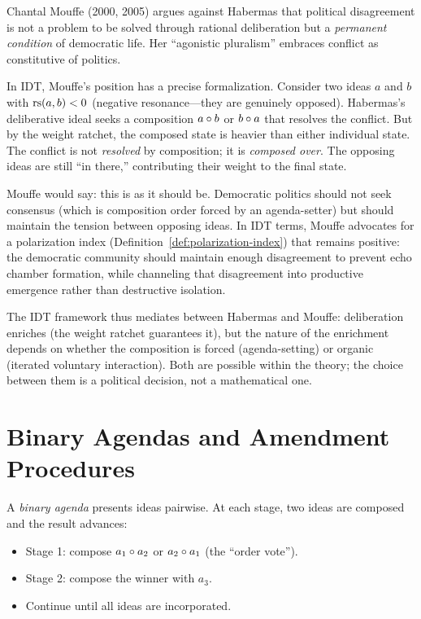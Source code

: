 \begin{interpretation}
\label{interp:mouffe}
Chantal Mouffe (2000, 2005) argues against Habermas that political
disagreement is not a problem to be solved through rational deliberation
but a \emph{permanent condition} of democratic life.  Her ``agonistic
pluralism'' embraces conflict as constitutive of politics.

In IDT, Mouffe's position has a precise formalization.  Consider two
ideas $a$ and $b$ with $\mathrm{rs}(a, b) < 0$ (negative resonance---they are
genuinely opposed).  Habermas's deliberative ideal seeks a composition
$a \circ b$ or $b \circ a$ that resolves the conflict.  But by
the weight ratchet, the composed state is heavier than either individual
state.  The conflict is not \emph{resolved} by composition; it is
\emph{composed over}.  The opposing ideas are still ``in there,''
contributing their weight to the final state.

Mouffe would say: this is as it should be.  Democratic politics should not
seek consensus (which is composition order forced by an agenda-setter) but
should maintain the tension between opposing ideas.  In IDT terms, Mouffe
advocates for a polarization index (Definition~\ref{def:polarization-index})
that remains positive: the democratic community should maintain enough
disagreement to prevent echo chamber formation, while channeling that
disagreement into productive emergence rather than destructive isolation.

The IDT framework thus mediates between Habermas and Mouffe: deliberation
enriches (the weight ratchet guarantees it), but the nature of the enrichment
depends on whether the composition is forced (agenda-setting) or organic
(iterated voluntary interaction).  Both are possible within the theory;
the choice between them is a political decision, not a mathematical one.
\end{interpretation}


\section{Binary Agendas and Amendment Procedures}

\begin{definition}
\label{def:binary-agenda}
A \emph{binary agenda} presents ideas pairwise.  At each stage, two ideas
are composed and the result advances:
\begin{itemize}
  \item Stage 1: compose $a_1 \circ a_2$ or $a_2 \circ a_1$
        (the ``order vote'').
  \item Stage 2: compose the winner with $a_3$.
  \item Continue until all ideas are incorporated.
\end{itemize}
\end{definition}

